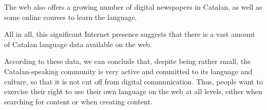 \begin{multicols}{2}
The web also offers a growing number of digital newspapers in Catalan, as well as some online courses to learn the language. 

All in all, this significant Internet presence suggests that there is a vast amount of Catalan language data available on the web. 

According to these data, we can conclude that, despite being rather small, the Catalan-speaking community is very active and committed to its language and culture, so that it is not cut off from digital communication. Thus, people want to exercise their right to use their own language on the web at all levels, either when searching for content or when creating content. 
\end{multicols}

\clearpage



